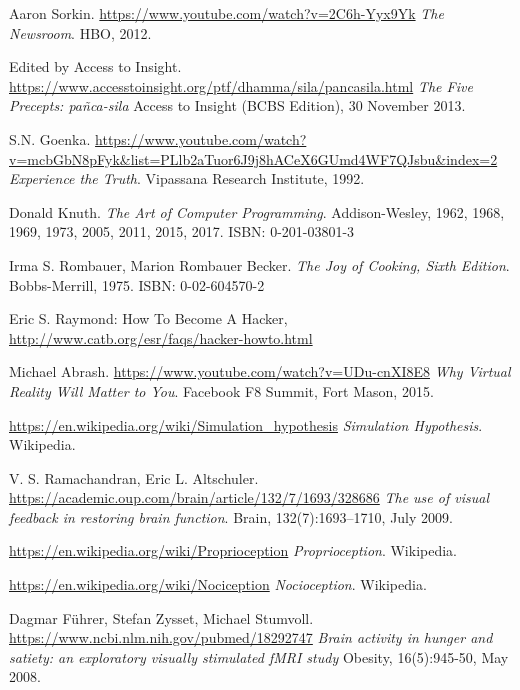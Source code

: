 \documentclass{article}
\begin{document}
\begin{thebibliography}{99}
\raggedright

  Aaron Sorkin.
  \url{https://www.youtube.com/watch?v=2C6h-Yyx9Yk}
  \textit{The Newsroom}.
  HBO, 2012.

  Edited by Access to Insight.
  \url{https://www.accesstoinsight.org/ptf/dhamma/sila/pancasila.html}
  \textit{The Five Precepts: pañca-sila}
  Access to Insight (BCBS Edition), 30 November 2013.

  S.N. Goenka.
  \url{https://www.youtube.com/watch?v=mcbGbN8pFyk&list=PLlb2aTuor6J9j8hACeX6GUmd4WF7QJsbu&index=2}
  \textit{Experience the Truth}.
  Vipassana Research Institute, 1992.

  Donald Knuth.
  \textit{The Art of Computer Programming}.
  Addison-Wesley, 1962, 1968, 1969, 1973, 2005, 2011, 2015, 2017.
  ISBN: 0-201-03801-3

  Irma S. Rombauer, Marion Rombauer Becker.
  \textit{The Joy of Cooking, Sixth Edition}.
  Bobbs-Merrill, 1975.
  ISBN: 0-02-604570-2

  Eric S. Raymond: How To Become A Hacker,
  \url{http://www.catb.org/esr/faqs/hacker-howto.html}

  Michael Abrash.
  \url{https://www.youtube.com/watch?v=UDu-cnXI8E8}
  \textit{Why Virtual Reality Will Matter to You}.
  Facebook F8 Summit, Fort Mason, 2015.

  \url{https://en.wikipedia.org/wiki/Simulation_hypothesis}
  \textit{Simulation Hypothesis}.
  Wikipedia.

  V. S. Ramachandran, Eric L. Altschuler.
  \url{https://academic.oup.com/brain/article/132/7/1693/328686}
  \textit{The use of visual feedback in restoring brain function}.
  Brain, 132(7):1693–1710, July 2009.

  \url{https://en.wikipedia.org/wiki/Proprioception}
  \textit{Proprioception}.
  Wikipedia.

  \url{https://en.wikipedia.org/wiki/Nociception}
  \textit{Nocioception}.
  Wikipedia.

  Dagmar Führer, Stefan Zysset, Michael Stumvoll.
  \url{https://www.ncbi.nlm.nih.gov/pubmed/18292747}
  \textit{Brain activity in hunger and satiety: an exploratory visually stimulated fMRI study}
  Obesity, 16(5):945-50, May 2008.


\end{thebibliography}
\end{document}
